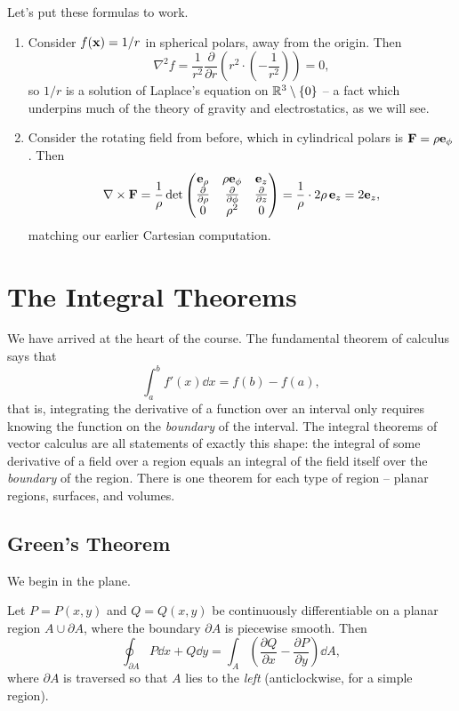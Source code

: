 \documentclass[a4paper]{scrartcl}
\begin{document}
\begin{example}
	Let's put these formulas to work.
	\begin{enumerate}[label=(\roman*)]
		\item Consider $f(\mathbf{x}) = 1/r$ in spherical polars, away from the origin. Then
		$$
		\nabla^2 f = \frac{1}{r^2}\frac{\partial}{\partial r}\left(r^2 \cdot \left(-\frac{1}{r^2}\right)\right) = 0,
		$$
		so $1/r$ is a solution of Laplace's equation on $\mathbb{R}^3 \setminus \{0\}$ -- a fact which underpins much of the theory of gravity and electrostatics, as we will see.
		\item Consider the rotating field from before, which in cylindrical polars is $\mathbf{F} = \rho \mathbf{e}_\phi$. Then
		$$
		\nabla \times \mathbf{F} = \frac{1}{\rho}\det\begin{pmatrix}
			\mathbf{e}_\rho & \rho \mathbf{e}_\phi & \mathbf{e}_z \\
			\frac{\partial}{\partial \rho} & \frac{\partial}{\partial \phi} & \frac{\partial}{\partial z} \\
			0 & \rho^2 & 0
		\end{pmatrix} = \frac{1}{\rho} \cdot 2\rho \, \mathbf{e}_z = 2 \mathbf{e}_z,
		$$
		matching our earlier Cartesian computation.
	\end{enumerate}
\end{example}
\section{The Integral Theorems}

We have arrived at the heart of the course. The fundamental theorem of calculus says that
$$
\int_a^b f'(x) \dd x = f(b) - f(a),
$$
that is, integrating the derivative of a function over an interval only requires knowing the function on the \emph{boundary} of the interval. The integral theorems of vector calculus are all statements of exactly this shape: the integral of some derivative of a field over a region equals an integral of the field itself over the \emph{boundary} of the region. There is one theorem for each type of region -- planar regions, surfaces, and volumes.

\subsection{Green's Theorem}

We begin in the plane.

\begin{theorem}
	Let $P = P(x, y)$ and $Q = Q(x, y)$ be continuously differentiable on a planar region $A \cup \partial A$, where the boundary $\partial A$ is piecewise smooth. Then
	$$
	\oint_{\partial A} P \dd x + Q \dd y = \int_A \left(\frac{\partial Q}{\partial x} - \frac{\partial P}{\partial y}\right) \dd A,
	$$
	where $\partial A$ is traversed so that $A$ lies to the \emph{left} (anticlockwise, for a simple region).
\end{theorem}
\end{document}
